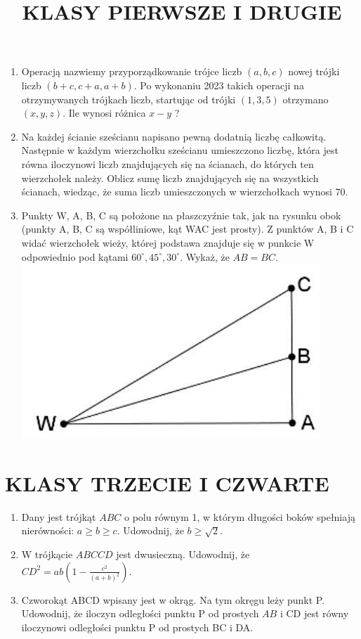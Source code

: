 \documentclass[10pt]{article}
\title{KLASY PIERWSZE I DRUGIE }
\author{}
\date{}
\begin{document}
\maketitle
\begin{enumerate}
  \item Operacją nazwiemy przyporządkowanie trójce liczb \((a, b, c)\) nowej trójki liczb \((b+c, c+a, a+b)\). Po wykonaniu 2023 takich operacji na otrzymywanych trójkach liczb, startując od trójki \((1,3,5)\) otrzymano \((x, y, z)\). Ile wynosi różnica \(x-y\) ?
  \item Na każdej ścianie sześcianu napisano pewną dodatnią liczbę całkowitą. Następnie w każdym wierzchołku sześcianu umieszczono liczbę, która jest równa iloczynowi liczb znajdujących się na ścianach, do których ten wierzchołek należy. Oblicz sumę liczb znajdujących się na wszystkich ścianach, wiedząc, że suma liczb umieszczonych w wierzchołkach wynosi 70.
  \item Punkty W, A, B, C są położone na płaszczyźnie tak, jak na rysunku obok (punkty A, B, C są współliniowe, kąt WAC jest prosty). Z punktów A, B i C widać wierzchołek wieży, której podstawa znajduje się w punkcie W odpowiednio pod kątami \(60^{\circ}, 45^{\circ}, 30^{\circ}\). Wykaż, że \(A B=B C\).\\
\includegraphics[max width=\textwidth, center]{2024_11_21_5f24e24876ae7b240204g-1}
\end{enumerate}

\section*{KLASY TRZECIE I CZWARTE}
\begin{enumerate}
  \item Dany jest trójkąt \(A B C\) o polu równym 1, w którym długości boków spełniają nierówności: \(a \geq b \geq c\). Udowodnij, że \(b \geq \sqrt{2}\).
  \item W trójkącie \(A B C C D\) jest dwusieczną. Udowodnij, że \(C D^{2}=a b\left(1-\frac{c^{2}}{(a+b)^{2}}\right)\).
  \item Czworokąt ABCD wpisany jest w okrąg. Na tym okręgu leży punkt P. Udowodnij, że iloczyn odległości punktu P od prostych \(A B\) i CD jest równy iloczynowi odległości punktu P od prostych BC i DA.
\end{enumerate}
\end{document}
